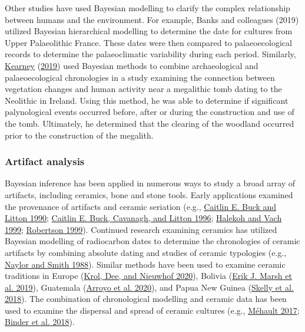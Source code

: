 \documentclass[
]{article}
\begin{document}
Other studies have used Bayesian modelling to clarify the complex
relationship between humans and the environment. For example, Banks and
colleagues (2019) utilized Bayesian hierarchical modelling to determine
the date for cultures from Upper Palaeolithic France. These dates were
then compared to palaeoecological records to determine the
palaeoclimatic variability during each period. Similarly,
\protect\hyperlink{ref-kearney_vegetation_2019}{Kearney}
(\protect\hyperlink{ref-kearney_vegetation_2019}{2019}) used Bayesian
methods to combine archaeological and palaeoecological chronologies in a
study examining the connection between vegetation changes and human
activity near a megalithic tomb dating to the Neolithic in Ireland.
Using this method, he was able to determine if significant palynological
events occurred before, after or during the construction and use of the
tomb. Ultimately, he determined that the clearing of the woodland
occurred prior to the construction of the megalith.

\hypertarget{artifact-analysis}{%
\subsubsection{Artifact analysis}\label{artifact-analysis}}

Bayesian inference has been applied in numerous ways to study a broad
array of artifacts, including ceramics, bone and stone tools. Early
applications examined the provenance of artifacts and ceramic seriation
(e.g., \protect\hyperlink{ref-buck_computational_1990}{Caitlin E. Buck
and Litton 1990}; \protect\hyperlink{ref-buck_bayesian_1996}{Caitlin E.
Buck, Cavanagh, and Litton 1996};
\protect\hyperlink{ref-halekoh_bayesian_1999}{Halekoh and Vach 1999};
\protect\hyperlink{ref-robertson_spatial_1999}{Robertson 1999}).
Continued research examining ceramics has utilized Bayesian modelling of
radiocarbon dates to determine the chronologies of ceramic artifacts by
combining absolute dating and studies of ceramic typologies (e.g.,
\protect\hyperlink{ref-naylor_archaeological_1988}{Naylor and Smith
1988}). Similar methods have been used to examine ceramic traditions in
Europe (\protect\hyperlink{ref-krol_chronology_2020}{Krol, Dee, and
Nieuwhof 2020}), Bolivia
(\protect\hyperlink{ref-marsh_temporal_2019}{Erik J. Marsh et al.
2019}), Guatemala (\protect\hyperlink{ref-arroyo_refining_2020}{Arroyo
et al. 2020}), and Papua New Guinea
(\protect\hyperlink{ref-skelly_changing_2018}{Skelly et al. 2018}). The
combination of chronological modelling and ceramic data has been used to
examine the dispersal and spread of ceramic cultures (e.g.,
\protect\hyperlink{ref-mehault_applying_2017}{Méhault 2017};
\protect\hyperlink{ref-binder_modelling_2018}{Binder et al. 2018}).
\end{document}
